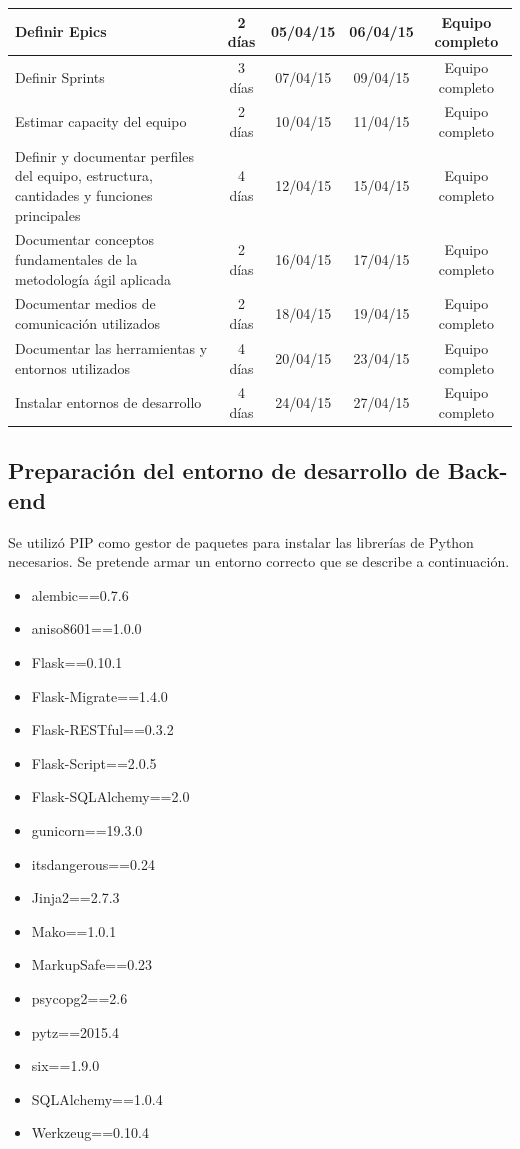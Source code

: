 {\begin{center}
\begin{longtable}{|p{6cm}|c|c|c|c|}
  Definir Epics & 2 días & 05/04/15 & 06/04/15& Equipo completo \\ \hline
  Definir Sprints & 3 días & 07/04/15 & 09/04/15& Equipo completo \\ \hline
  Estimar capacity del equipo & 2 días & 10/04/15 & 11/04/15& Equipo completo \\ \hline
  Definir y documentar perfiles del equipo, estructura, cantidades y funciones principales & 4 días & 12/04/15 & 15/04/15& Equipo completo \\ \hline
  Documentar conceptos fundamentales de la metodología ágil aplicada & 2 días & 16/04/15 & 17/04/15& Equipo completo \\ \hline
  Documentar medios de comunicación utilizados & 2 días & 18/04/15 & 19/04/15& Equipo completo \\ \hline
  Documentar las herramientas y entornos utilizados & 4 días & 20/04/15 & 23/04/15& Equipo completo \\ \hline
  Instalar entornos de desarrollo & 4 días & 24/04/15 & 27/04/15& Equipo completo \\ \hline
\end{longtable}
\end{center}
}

\subsection{Preparación del entorno de desarrollo de Back-end}
Se utilizó PIP como gestor de paquetes para instalar las librerías de Python necesarios. Se pretende armar un entorno correcto que se describe a continuación.
\begin{itemize}
\item alembic==0.7.6 
\item aniso8601==1.0.0
\item Flask==0.10.1
\item  Flask-Migrate==1.4.0
\item  Flask-RESTful==0.3.2
\item  Flask-Script==2.0.5
\item  Flask-SQLAlchemy==2.0
\item gunicorn==19.3.0
\item  itsdangerous==0.24
\item  Jinja2==2.7.3
\item  Mako==1.0.1
\item  MarkupSafe==0.23
\item  psycopg2==2.6
\item pytz==2015.4
\item six==1.9.0
\item SQLAlchemy==1.0.4
\item Werkzeug==0.10.4
\end{itemize}



